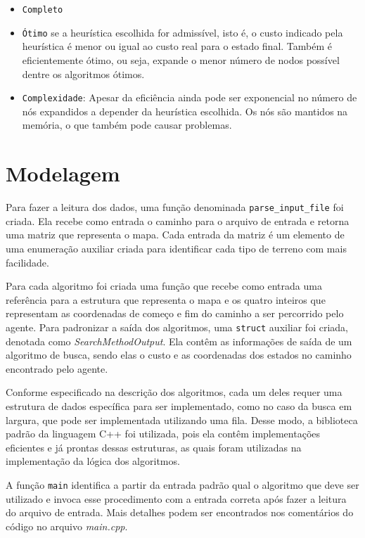 \documentclass{article}
\begin{document}
\begin{itemize}
	      \begin{itemize}
		      \item \texttt{Completo}
		      \item \texttt{Ótimo} se a heurística escolhida for admissível, isto é, o custo indicado pela heurística é menor ou igual
		            ao custo real para o estado final. Também é eficientemente ótimo, ou seja, expande o
		            menor número de nodos possível dentre os
		            algoritmos ótimos.
		      \item \texttt{Complexidade}: Apesar da eficiência ainda pode ser exponencial no número de nós expandidos a depender da heurística escolhida. Os nós são mantidos na memória,
		            o que também pode causar problemas.
	      \end{itemize}

\end{itemize}

\section{Modelagem}

Para fazer a leitura dos dados, uma função denominada \texttt{parse\_input\_file} foi criada. Ela recebe como entrada o caminho
para o arquivo de entrada e retorna uma matriz que representa o mapa. Cada entrada da matriz é um elemento de uma enumeração auxiliar
criada para identificar cada tipo de terreno com mais facilidade.

Para cada algoritmo foi criada uma função que recebe como entrada uma referência para a estrutura que representa o mapa e os quatro inteiros que representam
as coordenadas de começo e fim do caminho a ser percorrido pelo agente. Para padronizar a saída dos algoritmos, uma \texttt{struct} auxiliar foi criada,
denotada como \textit{SearchMethodOutput}. Ela contêm as informações de saída de um algoritmo de busca, sendo elas o custo e as coordenadas dos estados no caminho encontrado
pelo agente.

Conforme especificado na descrição dos algoritmos, cada um deles requer uma estrutura de dados específica para ser implementado, como no caso da busca em largura, que pode
ser implementada utilizando uma fila. Desse modo, a biblioteca padrão da linguagem C++ foi utilizada, pois ela contêm implementações eficientes e já prontas dessas estruturas,
as quais foram utilizadas na implementação da lógica dos algoritmos.

A função \texttt{main} identifica a partir da entrada padrão qual o algoritmo que deve ser utilizado e invoca esse procedimento
com a entrada correta após fazer a leitura do arquivo de entrada. Mais detalhes podem ser encontrados nos comentários do código no arquivo \textit{main.cpp}.
\end{document}
